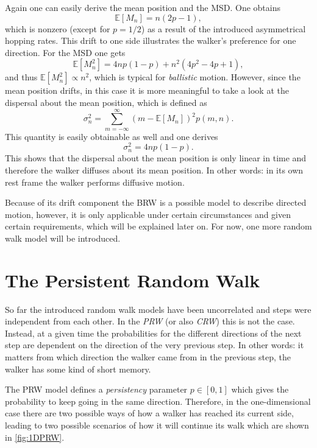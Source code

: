 Again one can easily derive the mean position and the \acs{MSD}. One obtains
\begin{equation*}
 \mathbb{E}\left[M_n\right]=n\left(2p-1\right),
\end{equation*}
which is nonzero (except for $p=1/2$) as a result of the introduced asymmetrical hopping rates. This drift to one side illustrates the walker's preference for one direction. For the \acs{MSD} one gets
\begin{equation*}
 \mathbb{E}\left[M^2_n\right]=4np\left(1-p\right)+n^2\left(4p^2-4p+1\right),
\end{equation*}
and thus \mbox{$\mathbb{E}\left[M^2_n\right]\propto n^2$}, which is typical for \textit{ballistic} motion. However, since the mean position drifts, in this case it is more meaningful to take a look at the dispersal about the mean position, which is defined as
\begin{equation}
 \sigma^2_n=\sum^\infty_{m=-\infty}\left(m-\mathbb{E}\left[M_n\right]\right)^2p\left(m,n\right).
\end{equation}
This quantity is easily obtainable as well and one derives
\begin{equation*}
 \sigma^2_n=4np\left(1-p\right).
\end{equation*}
This shows that the dispersal about the mean position is only linear in time and therefore the walker diffuses about its mean position. In other words: in its own rest frame the walker performs diffusive motion.

Because of its drift component the \acs{BRW} is a possible model to describe directed motion, however, it is only applicable under certain circumstances and given certain requirements, which will be explained later on. For now, one more random walk model will be introduced.

\section{The Persistent Random Walk}
So far the introduced random walk models have been uncorrelated and steps were independent from each other. In the \textit{\ac{PRW}} (or also \textit{\ac{CRW}}) this is not the case. Instead, at a given time the probabilities for the different directions of the next step are dependent on the direction of the very previous step. In other words: it matters from which direction the walker came from in the previous step, the walker has some kind of short memory.

The \acs{PRW} model defines a \textit{persistency} parameter $p \in \left[0,1\right]$ which gives the probability to keep going in the same direction. Therefore, in the one-dimensional case there are two possible ways of how a walker has reached its current side, leading to two possible scenarios of how it will continue its walk which are shown in \autoref{fig:1DPRW}.

